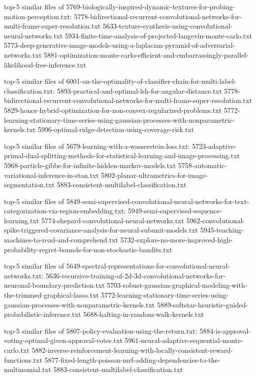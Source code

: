 \documentclass[11pt]{article}
\begin{document}
top-5 similar files of
5769-biologically-inspired-dynamic-textures-for-probing-motion-perception.txt:
5778-bidirectional-recurrent-convolutional-networks-for-multi-frame-super-resolution.txt
5633-texture-synthesis-using-convolutional-neural-networks.txt
5934-finite-time-analysis-of-projected-langevin-monte-carlo.txt
5773-deep-generative-image-models-using-a-laplacian-pyramid-of-adversarial-networks.txt
5881-optimization-monte-carlo-efficient-and-embarrassingly-parallel-likelihood-free-inference.txt

top-5 similar files of
6001-on-the-optimality-of-classifier-chain-for-multi-label-classification.txt:
5893-practical-and-optimal-lsh-for-angular-distance.txt
5778-bidirectional-recurrent-convolutional-networks-for-multi-frame-super-resolution.txt
5829-honor-hybrid-optimization-for-non-convex-regularized-problems.txt
5772-learning-stationary-time-series-using-gaussian-processes-with-nonparametric-kernels.txt
5996-optimal-ridge-detection-using-coverage-risk.txt

top-5 similar files of 5679-learning-with-a-wasserstein-loss.txt:
5723-adaptive-primal-dual-splitting-methods-for-statistical-learning-and-image-processing.txt
5968-particle-gibbs-for-infinite-hidden-markov-models.txt
5758-automatic-variational-inference-in-stan.txt
5802-planar-ultrametrics-for-image-segmentation.txt
5883-consistent-multilabel-classification.txt

top-5 similar files of
5849-semi-supervised-convolutional-neural-networks-for-text-categorization-via-region-embedding.txt:
5949-semi-supervised-sequence-learning.txt
5774-shepard-convolutional-neural-networks.txt
5962-convolutional-spike-triggered-covariance-analysis-for-neural-subunit-models.txt
5945-teaching-machines-to-read-and-comprehend.txt
5732-explore-no-more-improved-high-probability-regret-bounds-for-non-stochastic-bandits.txt

top-5 similar files of
5649-spectral-representations-for-convolutional-neural-networks.txt:
5636-recursive-training-of-2d-3d-convolutional-networks-for-neuronal-boundary-prediction.txt
5703-robust-gaussian-graphical-modeling-with-the-trimmed-graphical-lasso.txt
5772-learning-stationary-time-series-using-gaussian-processes-with-nonparametric-kernels.txt
5889-softstar-heuristic-guided-probabilistic-inference.txt
5688-halting-in-random-walk-kernels.txt

top-5 similar files of 5807-policy-evaluation-using-the-return.txt:
5884-is-approval-voting-optimal-given-approval-votes.txt
5961-neural-adaptive-sequential-monte-carlo.txt
5882-inverse-reinforcement-learning-with-locally-consistent-reward-functions.txt
5877-fixed-length-poisson-mrf-adding-dependencies-to-the-multinomial.txt
5883-consistent-multilabel-classification.txt
\end{document}
